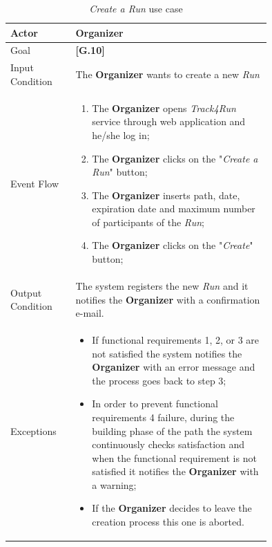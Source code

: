 \begin{center}
\begin{table}[H]
\begin{tabular}{ | l | p{0.75\linewidth} | }
  \hline
    Actor & \textbf{Organizer} \\ \hline
    Goal & \textbf{[G.10]} \\ \hline
    Input Condition & The \textbf{Organizer} wants to create a new \textit{Run} \\ \hline
    Event Flow & \begin{minipage}[t]{0.7\textwidth}
      \begin{enumerate}
        \item The \textbf{Organizer} opens \textit{Track4Run} service through web application and he/she log in;
        \item The \textbf{Organizer} clicks on the "\textit{Create a Run}" button;
        \item The \textbf{Organizer} inserts path, date, expiration date and maximum number of participants of the \textit{Run};
        \item The \textbf{Organizer} clicks on the "\textit{Create}" button;
      \end{enumerate}
    \smallskip
  \end{minipage} \\ \hline
  Output Condition & The system registers the new \textit{Run} and it notifies the \textbf{Organizer} with a confirmation e-mail. \\ \hline
  Exceptions & \begin{minipage}[t]{0.7\textwidth}
    \begin{itemize}
      \smallskip
      \item If functional requirements 1, 2, or 3 are not satisfied the system notifies the \textbf{Organizer} with an error message and the process goes back to step 3;
      \item In order to prevent functional requirements 4 failure, during the building phase of the path the system continuously checks satisfaction and when the functional requirement is not satisfied it notifies the \textbf{Organizer} with a warning;
      \item If the \textbf{Organizer} decides to leave the creation process this one is aborted.
    \end{itemize}
    \smallskip
  \end{minipage}  \\ \hline
\end{tabular}
\caption{\textit{Create a Run} use case}
\label{table:createRunTable}
\end{table}
\end{center}

